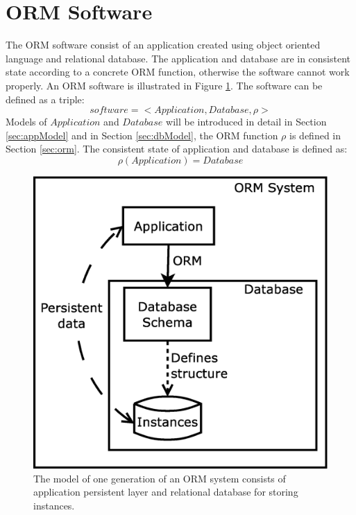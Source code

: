 \documentclass[11pt]{article}
\begin{document}
\section{ORM Software}
\label{sec:evolution}
The ORM software consist of an application created using object oriented language and relational database. The application and database are in consistent state according to a concrete ORM function, otherwise the software cannot work properly. An ORM software is illustrated in Figure \ref{fig:appStructure}. The software can be defined as a triple:
\begin{equation*}
	software = < Application, Database, \rho >
\end{equation*}
Models of $Application$ and $Database$ will be introduced in detail in Section \ref{sec:appModel} and in Section \ref{sec:dbModel}, the ORM function $\rho$ is defined in Section \ref{sec:orm}. The consistent state of application and database is defined as:
$$\rho(Application) = Database$$
 
\begin{figure}
\begin{center}
	\includegraphics[scale=0.3]{./images/system}
	\caption{The model of one generation of an ORM system consists of application persistent layer and relational database for storing instances.}
\end{center}
	\label{fig:appStructure}
\end{figure}
\end{document}
